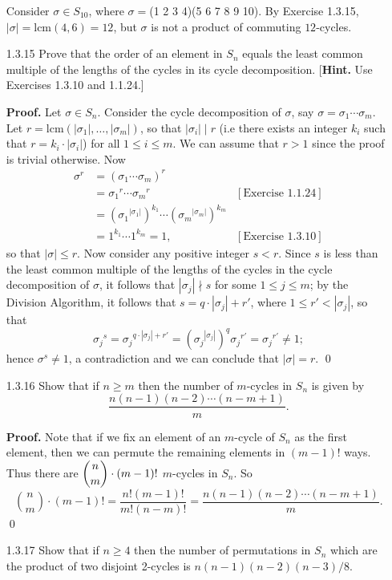 \begin{enumerate}
      Consider $\sigma \in S_{10}$, where $\sigma = $(1 2 3 4)(5 6 7 8 9 10). By
      Exercise 1.3.15, $|\sigma| = \text{lcm}(4, 6) = 12$, but $\sigma$ is not a 
      product of commuting $12$-cycles.
   \item[1.3.15]  Prove that the order of an element in $S_n$ equals the least
                  common multiple of the lengths of the cycles in its cycle
                  decomposition.
                  [\textbf{Hint.} Use Exercises 1.3.10 and 1.1.24.]

      \textbf{Proof.} Let $\sigma \in S_n$. Consider the cycle decomposition of
      $\sigma$, say $\sigma = \sigma_1\cdots\sigma_m$. Let
      $r = \text{lcm}(|\sigma_1|, \ldots, |\sigma_m|)$, so that
      $|\sigma_i| \mid r$ (i.e there exists an integer $k_i$ such that
      $r = k_i \cdot |\sigma_i|$) for all $1 \le i \le m$. We can assume that
      $r > 1$ since the proof is trivial otherwise. Now
      \begin{align*}
         \sigma^r &= (\sigma_1\cdots\sigma_m)^r \\
               &= {\sigma_1}^r\cdots{\sigma_m}^r &[\text{Exercise 1.1.24}] \\
               &= ({\sigma_1}^{|\sigma_1|})^{k_1}\cdots
                  ({\sigma_m}^{|\sigma_m|})^{k_m} \\
               &= 1^{k_1}\cdots1^{k_m} = 1, &[\text{Exercise 1.3.10}]
      \end{align*}
      so that $|\sigma| \le r$. Now consider any positive integer $s < r$. Since
      $s$ is less than the least common multiple of the lengths of the cycles in
      the cycle decomposition of $\sigma$, it follows that $|\sigma_j| \nmid s$
      for some $1 \le j \le m$; by the Division Algorithm, it follows that
      $s = q\cdot|\sigma_j| + r'$, where $1 \le r' < |\sigma_j|$, so that 
      $${\sigma_j}^s = {\sigma_j}^{q\cdot|\sigma_j| + r'} = 
        ({\sigma_j}^{|\sigma_j|})^q{\sigma_j}^{r'} = {\sigma_j}^{r'} \neq 1;$$
      hence $\sigma^s \neq 1$, a contradiction and we can conclude that
      $|\sigma| = r$. \qed
   \item[1.3.16]  Show that if $n \ge m$ then the number of $m$-cycles in $S_n$
                  is given by
                  $$\frac{n(n - 1)(n - 2) \cdots (n - m + 1)}{m}.$$

      \textbf{Proof.} Note that if we fix an element of an $m$-cycle of $S_n$
      as the first element, then we can permute the remaining elements in
      $(m - 1)!$ ways. Thus there are $\displaystyle\binom{n}{m} \cdot (m - 1)!$ $m$-cycles
      in $S_n$. So
      $$\binom{n}{m} \cdot (m - 1)! = \frac{n!(m - 1)!}{m!(n - m)!} =
        \frac{n(n - 1)(n - 2) \cdots (n - m + 1)}{m}.$$ \qed
   \item[1.3.17]  Show that if $n \ge 4$ then the number of permutations in
                  $S_n$ which are the product of two disjoint 2-cycles is
                  $n(n-1)(n-2)(n-3)/8$.


\end{enumerate}

